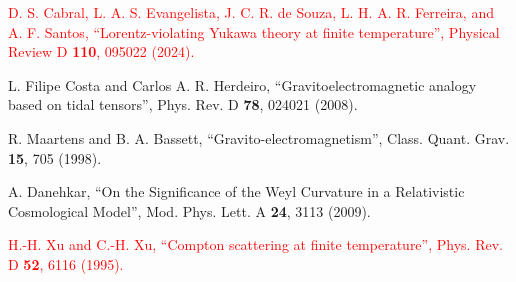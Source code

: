 \documentclass[11pt,showpacs,preprintnumbers,amsmath,amssymb,prd,nofootinbib,superscriptaddress]{revtex4-2}
\begin{document}
\begin{thebibliography}{100}
\textcolor{red}{ D. S. Cabral, L. A. S. Evangelista, J. C. R. de Souza, L. H. A. R. Ferreira, and A. F. Santos, ``Lorentz-violating Yukawa theory at finite temperature'',  {Physical Review D {\bf 110}, 095022 (2024).}}

 L. Filipe Costa and Carlos A. R. Herdeiro, ``Gravitoelectromagnetic analogy based on tidal tensors'',
 {Phys. Rev. D {\bf 78}, 024021 (2008). }

R. Maartens and B. A. Bassett, ``Gravito-electromagnetism'', 
 {Class. Quant. Grav. {\bf 15}, 705 (1998).}

 A. Danehkar, ``On the Significance of the Weyl Curvature in a Relativistic Cosmological Model'',
 {Mod. Phys. Lett. A {\bf 24}, 3113 (2009).}

\textcolor{red}{ H.-H. Xu and C.-H. Xu, ``Compton scattering at finite temperature'',  {Phys. Rev. D {\bf 52}, 6116 (1995).}}





\end{thebibliography}
\end{document}
